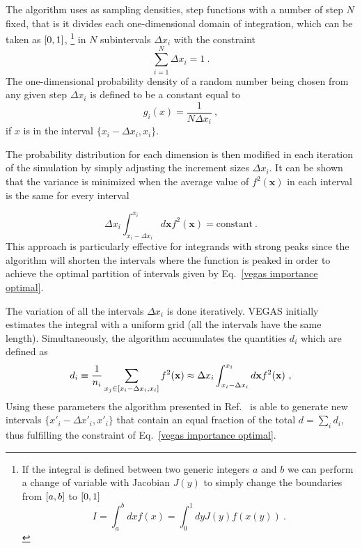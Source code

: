 \documentclass[../main/main.tex]{subfiles}
\begin{document}
The algorithm uses as sampling densities, step functions with a number of step $N$ fixed, that is it divides each one-dimensional domain of integration, which can be taken as $\interval{0}{1}$, \footnote{If the integral is defined between two generic integers $a$ and $b$ we can perform a change of variable with Jacobian $J(y)$ to simply change the boundaries from $\interval{a}{b}$ to $\interval{0}{1}$
\begin{equation}
	I = \int_a^b dx  f(x) = \int_0^1 dy J(y)f(x(y))  \ .
\end{equation}}
 in $N$ subintervals $\Delta x_i$ with the constraint
\begin{equation}
	\sum_{i=1}^N \Delta x_i = 1 \ .
\end{equation}
The one-dimensional probability density of a random number being chosen from any given step $\Delta x_i$ is defined to be a constant equal to
\begin{equation}
	g_i(x) = \frac{1}{N \Delta x_i} \ ,
\end{equation}
if $x$ is in the interval  $\{x_i - \Delta x_i, x_i \}$.

The probability distribution for each dimension is then modified in each iteration of the simulation by simply adjusting the increment sizes $\Delta x_i$.  It can be shown that the variance is minimized when the average value of $f^2(\textbf{x})$ in each interval is the same for every interval

\begin{equation}
	\label{vegas importance optimal}
	\Delta x_i \int_{x_i - \Delta x_i}^{x_i} d\textbf{x} f^2(\textbf{x}) = \text{constant} \ .
\end{equation}
This approach is particularly effective for integrands with strong peaks since the algorithm will shorten the intervals where the function is peaked in order to achieve the optimal partition of intervals given by Eq.~\ref{vegas importance optimal}.

The variation of all the intervals $\Delta x_i$ is done iteratively. 
VEGAS initially estimates the integral with a uniform grid (all the intervals have the same length). Simultaneously, the algorithm  accumulates the quantities $d_i$ which are defined as
\begin{equation}
	d_i \equiv \frac{1}{n_i} \sum_{x_j \in \interval{x_i - \Delta x_i}{x_i} } f^2(\textbf{x}) \approx \Delta x_i \int_{x_i - \Delta x_i}^{x_i} d\textbf{x} f^2(\textbf{x})  \ ,
\end{equation}
Using these parameters the algorithm presented in Ref.~\cite{Lepage:2020tgj} is able to generate new intervals $\{x'_i - \Delta x'_i, x'_i \}$ that contain an equal fraction of the total $d = \sum_i d_i$, thus fulfilling the constraint of Eq.~\ref{vegas importance optimal}.
\end{document}
